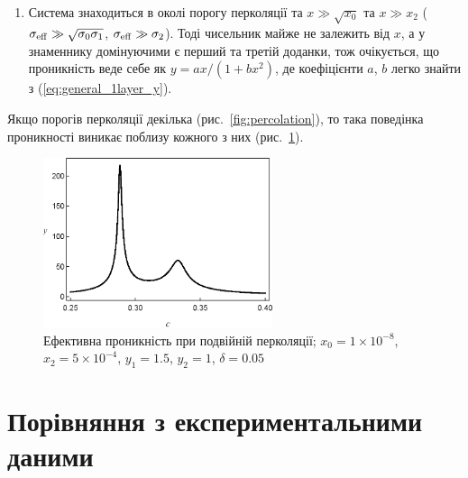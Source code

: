 \documentclass[14pt,twoside]{vakthesis}
\begin{document}
\begin{enumerate}
	\item Система знаходиться в околі порогу перколяції та $x \gg \sqrt{x_0}$ та $x \gg x_2$ ($\sigma_{\rm eff} \gg 
	\sqrt{\sigma_0 \sigma_1}$, $\sigma_{\rm eff} \gg \sigma_2$).
	Тоді чисельник майже не залежить від $x$, а у знаменнику домінуючими є перший та третій доданки, тож очікується, що проникність веде себе як $y = ax/(1+bx^2)$, де коефіцієнти $a$, $b$ легко знайти з (\ref{eq:general_1layer_y}).
\end{enumerate}

Якщо порогів перколяції декілька (рис.~\ref{fig:percolation}), то така поведінка проникності виникає поблизу кожного з них (рис.~\ref{fig:double-perc-eps}). 

\begin{figure}[tb]
	\centering
	\includegraphics[width=0.6\textwidth]{double-perc-eps.eps}
	\caption{\label{fig:double-perc-eps}
		Ефективна проникність при подвійній перколяції;
		$x_0 = 1 \times 10^{-8}$, $x_2 = 5 \times 10^{-4}$,
		$y_1 = 1.5$, $y_2 = 1$, $\delta = 0.05$}
\end{figure}


\section{Порівняння з експериментальними даними}
\end{document}
